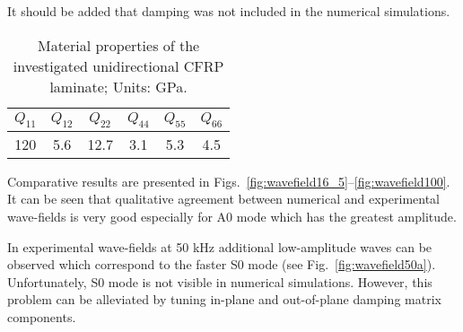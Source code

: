 \documentclass[runningheads]{llncs}
\begin{document}
It should be added that damping was not included in the numerical simulations.
\begin{table}[h!]
		\renewcommand{\arraystretch}{1.3}
	\caption{Material properties of the investigated unidirectional CFRP laminate; Units: GPa.}
	\begin{center}
			\begin{tabular}{cccccc} 
			\toprule
			$Q_{11}$ & $Q_{12}$  & $Q_{22}$ & $Q_{44}$ & $Q_{55}$ & $Q_{66}$\\
			\midrule
			120& 5.6& 12.7 & 3.1 & 5.3 & 4.5\\
			\bottomrule 
		\end{tabular} 
	\end{center}
		\label{tab:mat_prop}
\end{table}

Comparative results are presented in Figs.~\ref{fig:wavefield16_5}--\ref{fig:wavefield100}.
It can be seen that qualitative agreement between numerical and experimental wave-fields is very good especially for A0 mode which has the greatest amplitude.

In experimental wave-fields at 50 kHz additional low-amplitude waves can be observed which correspond to the faster S0 mode (see Fig.~\ref{fig:wavefield50a}).
Unfortunately, S0 mode is not visible in numerical simulations. 
However, this problem can be alleviated by tuning in-plane and out-of-plane damping matrix components.
\end{document}
